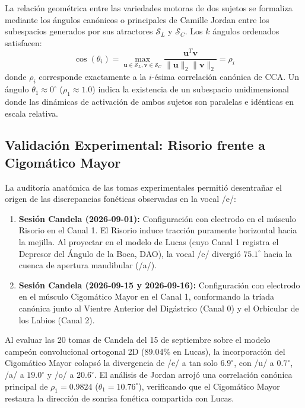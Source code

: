 \documentclass[11pt,a4paper,openany]{book}
\theoremstyle{definition}
\begin{document}
La relación geométrica entre las variedades motoras de dos sujetos se formaliza mediante los ángulos canónicos o principales de Camille Jordan entre los subespacios generados por sus atractores $\mathcal{S}_L$ y $\mathcal{S}_C$. Los $k$ ángulos ordenados satisfacen:
\begin{equation}
    \cos(\theta_i) = \max_{\mathbf{u} \in \mathcal{S}_L, \mathbf{v} \in \mathcal{S}_C} \frac{\mathbf{u}^T \mathbf{v}}{\|\mathbf{u}\|_2 \|\mathbf{v}\|_2} = \rho_i
    \label{eq:jordan_angles}
\end{equation}
donde $\rho_i$ corresponde exactamente a la $i$-ésima correlación canónica de CCA. Un ángulo $\theta_1 \approx 0^\circ$ ($\rho_1 \approx 1.0$) indica la existencia de un subespacio unidimensional donde las dinámicas de activación de ambos sujetos son paralelas e idénticas en escala relativa.

\subsection{Validación Experimental: Risorio frente a Cigomático Mayor}
\label{subsec:validacion_cigomatico}

La auditoría anatómica de las tomas experimentales permitió desentrañar el origen de las discrepancias fonéticas observadas en la vocal /e/:
\begin{enumerate}
    \item \textbf{Sesión Candela (2026-09-01):} Configuración con electrodo en el músculo Risorio en el Canal 1. El Risorio induce tracción puramente horizontal hacia la mejilla. Al proyectar en el modelo de Lucas (cuyo Canal 1 registra el Depresor del Ángulo de la Boca, DAO), la vocal /e/ divergió $75.1^\circ$ hacia la cuenca de apertura mandibular (/a/).
    \item \textbf{Sesión Candela (2026-09-15 y 2026-09-16):} Configuración con electrodo en el músculo Cigomático Mayor en el Canal 1, conformando la tríada canónica junto al Vientre Anterior del Digástrico (Canal 0) y el Orbicular de los Labios (Canal 2).
\end{enumerate}

Al evaluar las 20 tomas de Candela del 15 de septiembre sobre el modelo campeón convolucional ortogonal 2D (89.04\% en Lucas), la incorporación del Cigomático Mayor colapsó la divergencia de /e/ a tan solo $6.9^\circ$, con /u/ a $0.7^\circ$, /a/ a $19.0^\circ$ y /o/ a $20.6^\circ$. El análisis de Jordan arrojó una correlación canónica principal de $\rho_1 = 0.9824$ ($\theta_1 = 10.76^\circ$), verificando que el Cigomático Mayor restaura la dirección de sonrisa fonética compartida con Lucas.
\end{document}
